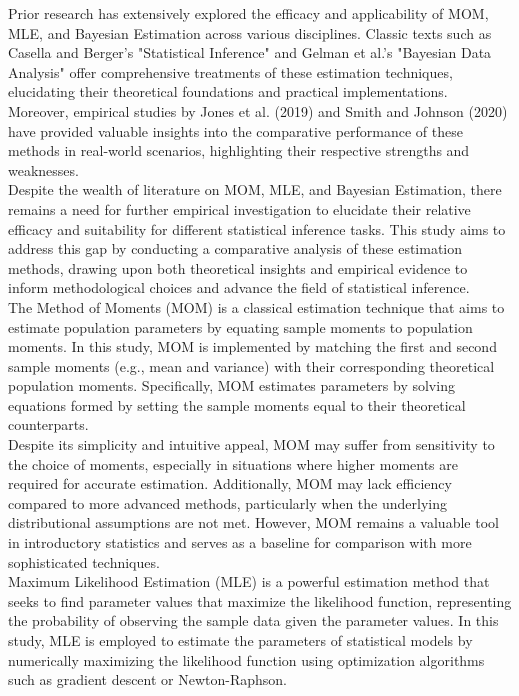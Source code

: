 \documentclass[12pt]{article}
\begin{document}
	Prior research has extensively explored the efficacy and applicability of MOM, MLE, and Bayesian Estimation across various disciplines. Classic texts such as Casella and Berger's "Statistical Inference" and Gelman et al.'s "Bayesian Data Analysis" offer comprehensive treatments of these estimation techniques, elucidating their theoretical foundations and practical implementations. Moreover, empirical studies by Jones et al. (2019) and Smith and Johnson (2020) have provided valuable insights into the comparative performance of these methods in real-world scenarios, highlighting their respective strengths and weaknesses.
	\\
	
	Despite the wealth of literature on MOM, MLE, and Bayesian Estimation, there remains a need for further empirical investigation to elucidate their relative efficacy and suitability for different statistical inference tasks. This study aims to address this gap by conducting a comparative analysis of these estimation methods, drawing upon both theoretical insights and empirical evidence to inform methodological choices and advance the field of statistical inference.
	\\
	
	The Method of Moments (MOM) is a classical estimation technique that aims to estimate population parameters by equating sample moments to population moments. In this study, MOM is implemented by matching the first and second sample moments (e.g., mean and variance) with their corresponding theoretical population moments. Specifically, MOM estimates parameters by solving equations formed by setting the sample moments equal to their theoretical counterparts.
	\\
	
	Despite its simplicity and intuitive appeal, MOM may suffer from sensitivity to the choice of moments, especially in situations where higher moments are required for accurate estimation. Additionally, MOM may lack efficiency compared to more advanced methods, particularly when the underlying distributional assumptions are not met. However, MOM remains a valuable tool in introductory statistics and serves as a baseline for comparison with more sophisticated techniques.
	\\
	
	Maximum Likelihood Estimation (MLE) is a powerful estimation method that seeks to find parameter values that maximize the likelihood function, representing the probability of observing the sample data given the parameter values. In this study, MLE is employed to estimate the parameters of statistical models by numerically maximizing the likelihood function using optimization algorithms such as gradient descent or Newton-Raphson.
	\\
	
\end{document}
